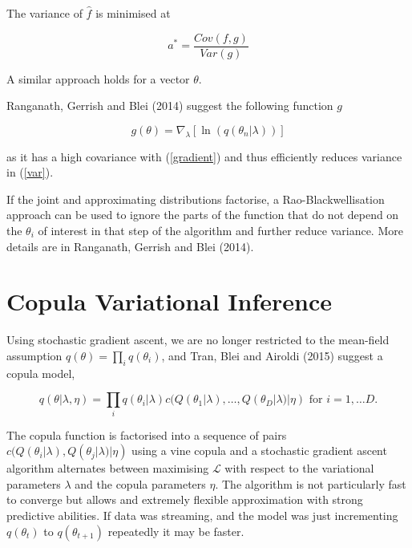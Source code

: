 \documentclass[12pt]{article}
\begin{document}
The variance of $\hat{f}$ is minimised at 

$$a^* = \frac{Cov(f, g)}{Var(g)}$$

A similar approach holds for a vector $\theta$.

Ranganath, Gerrish and Blei (2014) suggest the following function $g$

$$g(\theta) = \nabla_{\lambda} [\ln(q(\theta_n | \lambda))]$$

as it has a high covariance with (\ref{gradient}) and thus efficiently reduces variance in (\ref{var}).


If the joint and approximating distributions factorise, a Rao-Blackwellisation approach can be used to ignore the parts of the function that do not depend on the $\theta_i$ of interest in that step of the algorithm and further reduce variance. More details are in Ranganath, Gerrish and Blei (2014).

\section{Copula Variational Inference}

Using stochastic gradient ascent, we are no longer restricted to the mean-field assumption $q(\theta) = \prod_i q(\theta_i)$, and Tran, Blei and Airoldi (2015) suggest a copula model,

\begin{equation}
\label{copula}
q(\theta | \lambda, \eta) = \prod_{i} q(\theta_i|\lambda) c(Q(\theta_1|\lambda), \dots , Q(\theta_D|\lambda) |\eta) \mbox{ for } i = 1, \dots D.
\end{equation}


The copula function is factorised into a sequence of pairs $c(Q(\theta_i |\lambda), Q(\theta_j | \lambda) | \eta)$ using a vine copula and a stochastic gradient ascent algorithm alternates between maximising $\mathcal{L}$ with respect to the variational parameters $\lambda$ and the copula parameters $\eta$. 
The algorithm is not particularly fast to converge but allows and extremely flexible approximation with strong predictive abilities. If data was streaming, and the model was just incrementing $q(\theta_t)$ to $q(\theta_{t+1})$ repeatedly it may be faster.
\end{document}
